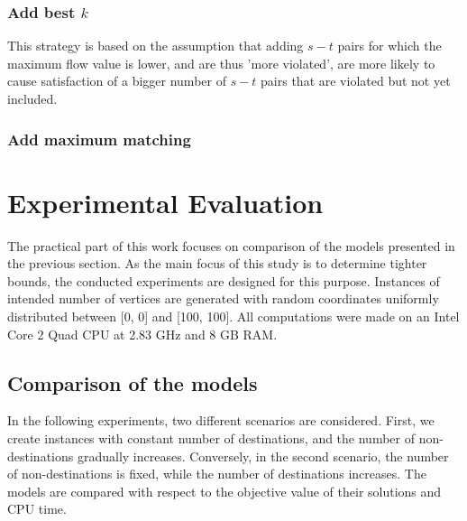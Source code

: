 \subsubsection{Add best $k$}

This strategy is based on the assumption that adding $s-t$ pairs for which the maximum flow value is lower, and are thus 'more violated', are more likely to cause satisfaction of a bigger number of $s-t$ pairs that are violated but not yet included.

\subsubsection{Add maximum matching}


\section{Experimental Evaluation}
\label{sec:exp}

The practical part of this work focuses on comparison of the models presented in the previous section. As the main focus of this study is to determine tighter bounds, the conducted experiments are designed for this purpose. Instances of intended number of vertices are generated with random coordinates uniformly distributed between [0, 0] and [100, 100]. All computations were made on an Intel Core 2 Quad CPU at 2.83 GHz and 8 GB RAM. 
\newpage
\subsection{Comparison of the models}


\label{sec:conclusion}
In the following experiments, two different scenarios are considered. First, we create instances with constant number of destinations, and the number of non-destinations gradually increases. Conversely, in the second scenario, the number of non-destinations is fixed, while the number of destinations increases. The models are compared with respect to the objective value of their solutions and CPU time.


